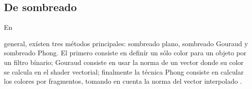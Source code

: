 \documentclass[stu, 12pt, letterpaper, donotrepeattitle, floatsintext, natbib]{apa7}
\begin{document}
    \subsection{De sombreado}
    En \begin{justifying}
      general, exísten tres métodos principales: sombreado plano, sombreado Gouraud y sombreado Phong.
      El primero consiste en definír un sólo color para un objeto por un filtro bínario; Gouraud consiste en usar
      la norma de un vector donde su color se calcula en el shader vectorial; finalmente la técnica Phong consiste
      en calcular los colores por fragmentos, tomando en cuenta la norma del vector interpolado \citep{unknown-author-no-dateB}.\par %
    \end{justifying}
    \vspace{\baselineskip}
    
    \newpage   
    \renewcommand\refname{\textbf{Referencias}}
    
    
\end{document}
